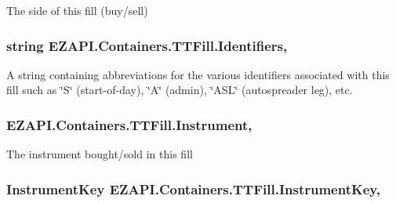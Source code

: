 The side of this fill (buy/sell) 

\hypertarget{class_e_z_a_p_i_1_1_containers_1_1_t_t_fill_ade039989a9fa8e950cf3809f5c897260}{
\subsubsection[{Identifiers}]{\setlength{\rightskip}{0pt plus 5cm}string E\-Z\-A\-P\-I.\-Containers.\-T\-T\-Fill.\-Identifiers\hspace{0.3cm}{\ttfamily [get]}, {\ttfamily [set]}}}\label{class_e_z_a_p_i_1_1_containers_1_1_t_t_fill_ade039989a9fa8e950cf3809f5c897260}


A string containing abbreviations for the various identifiers associated with this fill such as \char`\"{}\-S\char`\"{} (start-\/of-\/day), \char`\"{}\-A\char`\"{} (admin), \char`\"{}\-A\-S\-L\char`\"{} (autospreader leg), etc. 

\hypertarget{class_e_z_a_p_i_1_1_containers_1_1_t_t_fill_aff7afdba3f06200534f129e91c73f6a7}{
\subsubsection[{Instrument}]{ E\-Z\-A\-P\-I.\-Containers.\-T\-T\-Fill.\-Instrument\hspace{0.3cm}{\ttfamily [get]}, {\ttfamily [set]}}}\label{class_e_z_a_p_i_1_1_containers_1_1_t_t_fill_aff7afdba3f06200534f129e91c73f6a7}


The instrument bought/sold in this fill 

\hypertarget{class_e_z_a_p_i_1_1_containers_1_1_t_t_fill_a5c94d231f581f0513e0d3718bd6902b0}{
\subsubsection[{Instrument\-Key}]{\setlength{\rightskip}{0pt plus 5cm}Instrument\-Key E\-Z\-A\-P\-I.\-Containers.\-T\-T\-Fill.\-Instrument\-Key\hspace{0.3cm}{\ttfamily [get]}, {\ttfamily [set]}}}\label{class_e_z_a_p_i_1_1_containers_1_1_t_t_fill_a5c94d231f581f0513e0d3718bd6902b0}


